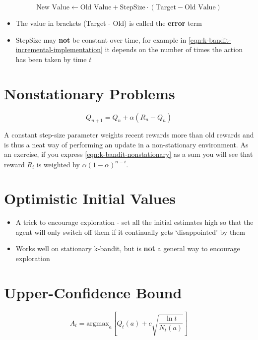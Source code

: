 \documentclass[11pt]{report}
\begin{document}
\begin{equation}
	\label{eqn:target-update-equation}
	\text{New Value} \xleftarrow{} \text{Old Value} + \text{StepSize}\cdot\left(\text{Target} - \text{Old Value}\right)
\end{equation}

\begin{itemize}
	\item The value in brackets (Target - Old) is called the \textbf{error} term
	\item StepSize may \textbf{not} be constant over time, for example in \autoref{eqn:k-bandit-incremental-implementation} it depends on the number of times the action has been taken by time $t$
\end{itemize}


\section{Nonstationary Problems}\label{par:Nonstationary}
\begin{equation}
	\label{eqn:k-bandit-nonstationary}
	Q_{n+1} = Q_{n} + \alpha\left(R_n - Q_n\right)
\end{equation}

A constant step-size parameter weights recent rewards more than old rewards and is thus a neat way of performing an update in a non-stationary environment. As an exercise, if you express \autoref{eqn:k-bandit-nonstationary} as a sum you will see that reward $R_i$ is weighted by $\alpha(1-\alpha)^{n-i}$.

\section{Optimistic Initial Values}
\begin{itemize}
	\item A trick to encourage exploration - set all the initial estimates high so that the agent will only switch off them if it continually gets `disappointed' by them
	\item Works well on stationary k-bandit, but is \textbf{not} a general way to encourage exploration
\end{itemize}

\section{Upper-Confidence Bound}\label{sec:UCB}
\begin{equation}
	\label{eqn:UCB}
	A_t = \text{argmax}_{a}\left[ Q_t(a) + c \sqrt{\frac{\ln{t}}{N_t(a)}}\right]
\end{equation}
\end{document}
